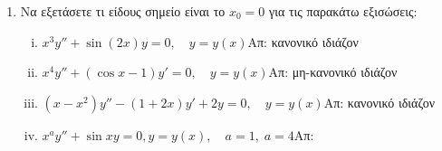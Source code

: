 


\pagestyle{empty}



\begin{center}
\end{center}

\vspace{\baselineskip}

\begin{enumerate}
\item Να εξετάσετε τι είδους σημείο είναι το $x_0=0$ για τις παρακάτω εξισώσεις:
\begin{enumerate}[i)]
\item $x^3y''+\sin(2x)y=0, \quad y=y(x)$\hfill Απ: κανονικό ιδιάζον
\item $x^4y'' + (\cos x-1)y'=0, \quad y=y(x)$\hfill Απ: μη-κανονικό ιδιάζον
\item $(x-x^2)y''-(1+2x)y'+2y=0, \quad y=y(x)$\hfill Απ: κανονικό ιδιάζον
\item $x^{a}y''+\sin x y=0, y=y(x), \quad a=1, \; a=4$\hfill Απ: 
\end{enumerate}


\end{enumerate}
